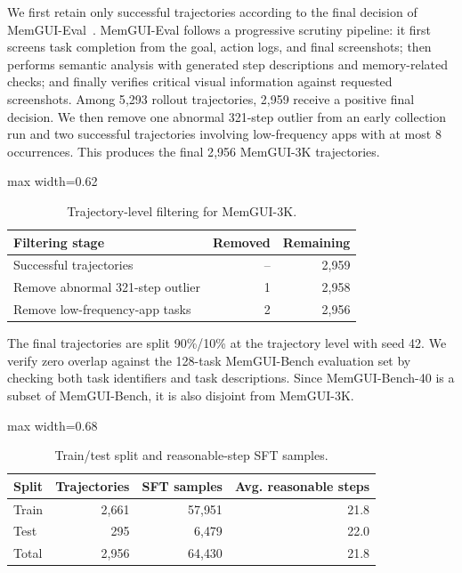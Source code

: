 \documentclass{llmxive}
\begin{document}
We first retain only successful trajectories according to the final decision of MemGUI-Eval~\cite{liu2026memgui}. MemGUI-Eval follows a progressive scrutiny pipeline: it first screens task completion from the goal, action logs, and final screenshots; then performs semantic analysis with generated step descriptions and memory-related checks; and finally verifies critical visual information against requested screenshots. Among 5{,}293 rollout trajectories, 2{,}959 receive a positive final decision. We then remove one abnormal 321-step outlier from an early collection run and two successful trajectories involving low-frequency apps with at most 8 occurrences. This produces the final 2{,}956 MemGUI-3K trajectories.

\begin{table}[!htbp]
\centering
\footnotesize
\begin{adjustbox}{max width=0.62\linewidth}
\begin{tabular}{lrr}
\toprule
Filtering stage & Removed & Remaining \\
\midrule
Successful trajectories & -- & 2{,}959 \\
Remove abnormal 321-step outlier & 1 & 2{,}958 \\
Remove low-frequency-app tasks & 2 & 2{,}956 \\
\bottomrule
\end{tabular}
\end{adjustbox}
\caption{Trajectory-level filtering for MemGUI-3K.}
\label{tab:appendix-filtering}
\end{table}

The final trajectories are split 90\%/10\% at the trajectory level with seed 42. We verify zero overlap against the 128-task MemGUI-Bench evaluation set by checking both task identifiers and task descriptions. Since MemGUI-Bench-40 is a subset of MemGUI-Bench, it is also disjoint from MemGUI-3K.

\begin{table}[!htbp]
\centering
\footnotesize
\begin{adjustbox}{max width=0.68\linewidth}
\begin{tabular}{lrrr}
\toprule
Split & Trajectories & SFT samples & Avg. reasonable steps \\
\midrule
Train & 2{,}661 & 57{,}951 & 21.8 \\
Test & 295 & 6{,}479 & 22.0 \\
\midrule
Total & 2{,}956 & 64{,}430 & 21.8 \\
\bottomrule
\end{tabular}
\end{adjustbox}
\caption{Train/test split and reasonable-step SFT samples.}
\label{tab:appendix-split}
\end{table}
\end{document}
